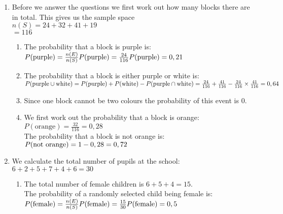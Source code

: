 \begin{solutions}{}{
\begin{enumerate}[itemsep=5pt, label=\textbf{\arabic*}. ] 

\item %
    Before we answer the questions we first work out how many blocks there are in total. This gives us the sample space\\
    $n(S) = 24 + 32 + 41 + 19$\\
	 $= 116$
    \begin{enumerate}[noitemsep, label=\textbf{(\alph*)} ]

    \item The probability that a block is purple is:\\
    $P(\mbox{purple}) = \frac{n(E)}{n(S)}\\
     P(\mbox{purple}) = \frac{24}{116}\\
     P(\mbox{purple}) = 0,21$

    \item The probability that a block is either purple or white is:\\
    $P(\mbox{purple} \cup \mbox{white}) = P(\mbox{purple}) + P(\mbox{white}) - P(\mbox{purple} \cap \mbox{white})\\
    = \frac{24}{116} + \frac{41}{116} - \frac{24}{116} \times \frac{41}{116}\\
    = 0,64$

    \item Since one block cannot be two colours the probability of this event is $0$.

    \item We first work out the probability that a block is orange:\\
    $P(\mbox{orange}) = \frac{32}{116}
	       = 0,28$\\
    The probability that a block is not orange is:\\
    $P(\mbox{not orange}) = 1 - 0,28\\
		   = 0,72$
    \end{enumerate}
    
\item %
We calculate the total number of pupils at the school:\\
$6 + 2 + 5 + 7 + 4 + 6 = 30$
    \begin{enumerate}[noitemsep, label=\textbf{(\alph*)} ]
    \item The total number of female children is $6 + 5 + 4 = 15$.\\
    The probability of a randomly selected child being female is:\\
    $P(\mbox{female}) = \frac{n(E)}{n(S)}\\
     P(\mbox{female}) = \frac{15}{30}\\
     P(\mbox{female}) = 0,5$


\end{enumerate}
\end{enumerate}}
\end{solutions}
